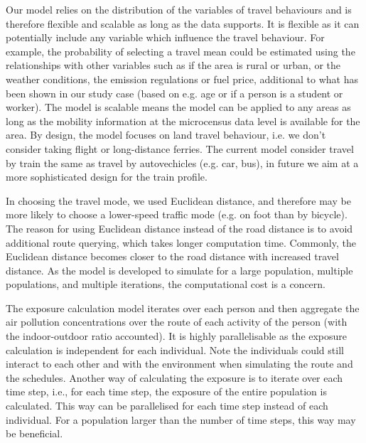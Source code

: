 \documentclass[]{article}
\begin{document}
Our model relies on the distribution of the variables of travel behaviours and is therefore flexible and scalable as long as the data supports. It is flexible as it can potentially include any variable which influence the travel behaviour. For example, the probability of selecting a travel mean could be estimated using the relationships with other variables such as if the area is rural or urban, or the weather conditions, the emission regulations or fuel price, additional to what has been shown in our study case (based on e.g. age or if a person is a student or worker). The model is scalable means the model can be applied to any areas as long as the mobility information at the microcensus data level is available for the area. By design, the model focuses on land travel behaviour, i.e. we don't consider taking flight or long-distance ferries. The current model consider travel by train the same as travel by autovechicles (e.g. car, bus), in future we aim at a more sophisticated design for the train profile. 

  
  In choosing the travel mode, we used Euclidean distance, and therefore may be more likely to choose a lower-speed traffic mode (e.g. on foot than by bicycle). The reason for using Euclidean distance instead of the road distance is to avoid additional route querying, which takes longer computation time. Commonly, the Euclidean distance becomes closer to the road distance with increased travel distance. As the model is developed to simulate for a large population, multiple populations, and multiple iterations, the computational cost is a concern.
 
    
The exposure calculation model iterates over each person and then aggregate the air pollution concentrations over the route of each activity of the person (with the indoor-outdoor ratio accounted). It is highly parallelisable as the exposure calculation is independent for each individual. Note the individuals could still interact to each other and with the environment when simulating the route and the schedules. Another way of calculating the exposure is to iterate over each time step, i.e., for each time step, the exposure of the entire population is calculated. This way can be parallelised for each time step instead of each individual. For a population larger than the number of time steps, this way may be beneficial.  
\end{document}
